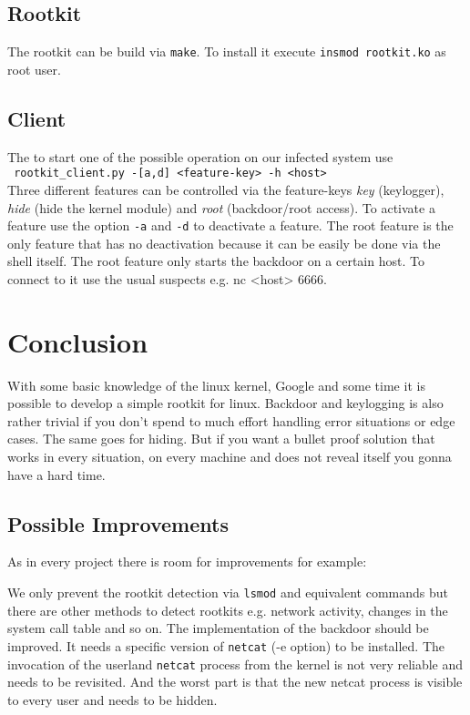 \documentclass[12pt]{article}
\newcommand{\shellcmd}[1]{\\\indent\indent\texttt{\footnotesize\ #1}\\}
\newcommand{\shellcmdinline}[1]{\texttt{\footnotesize #1}}
\begin{document}
\subsection{Rootkit}
The rootkit can be build via \shellcmdinline{make}. To install it execute \shellcmdinline{insmod rootkit.ko} as root user.

\subsection{Client}
The to start one of the possible operation on our infected system use \shellcmd{rootkit\_client.py~-[a,d]~<feature-key>~-h~<host>} Three different features can be controlled via the feature-keys \emph{key} (keylogger), \emph{hide} (hide the kernel module) and \emph{root} (backdoor/root access). To activate a feature use the option \shellcmdinline{-a} and \shellcmdinline{-d} to deactivate a feature. The root feature is the only feature that has no deactivation because it can be easily be done via the shell itself. The root feature only starts the backdoor on a certain host. To connect to it use the usual suspects e.g. \shellcmdinline\shellcmdinline{nc <host> 6666}.


\section{Conclusion}

With some basic knowledge of the linux kernel, Google and some time it is possible to develop a simple rootkit for linux. Backdoor and keylogging is also rather trivial if you don't spend to much effort handling error situations or edge cases. The same goes for hiding. But if you want a bullet proof solution that works in every situation, on every machine and does not reveal itself you gonna have a hard time. 

\label{sec:conc}
\subsection{Possible Improvements}
As in every project there is room for improvements for example:

We only prevent the rootkit detection via \shellcmdinline{lsmod} and equivalent commands but there are other methods to detect rootkits e.g. network activity, changes in the system call table and so on. The implementation of the backdoor should be improved. It needs a specific version of \shellcmdinline{netcat} (-e option) to be installed. The invocation of the userland \shellcmdinline{netcat} process from the kernel is not very reliable and needs to be revisited. And the worst part is that the new netcat process is visible to every user and needs to be hidden.  
\end{document}
